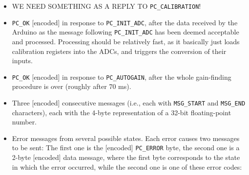 \documentclass[11pt,a4paper,english]{article}
\begin{document}
\begin{itemize}
\item WE NEED SOMETHING AS A REPLY TO \texttt{PC\_CALIBRATION}! 
\item \texttt{PC\_OK} [encoded] in response to \texttt{PC\_INIT\_ADC}, after the data received by the Arduino as the message following \texttt{PC\_INIT\_ADC} has been deemed acceptable and processed. Processing should be relatively fast, as it basically just loads calibration registers into the ADCs, and triggers the conversion of their inputs.
\item \texttt{PC\_OK} [encoded] in response to \texttt{PC\_AUTOGAIN}, after the whole gain-finding procedure is over (roughly after 70 ms).
\item Three [encoded] consecutive messages (i.e., each with \texttt{MSG\_START} and \texttt{MSG\_END} characters), each with the 4-byte representation of a 32-bit floating-point number.
\item Error messages from several possible states. Each error causes two messages to be sent: The first one is the [encoded] \texttt{PC\_ERROR} byte, the second one is a 2-byte [encoded] data message, where the first byte corresponds to the state in which the error occurred, while the second one is one of these error codes:


\end{itemize}
\end{document}
